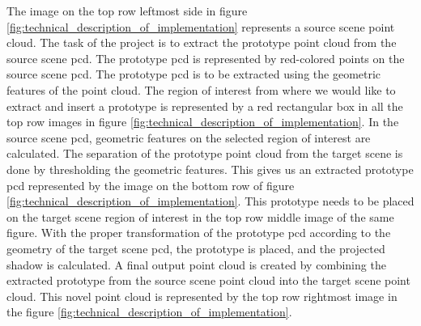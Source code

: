The image on the top row leftmost side in figure \ref{fig:technical_description_of_implementation} represents a source scene point cloud. The task of the project is to extract the prototype point cloud from the source scene \acrshort{pcd}. The prototype \acrshort{pcd} is represented by red-colored points on the source scene \acrshort{pcd}. The prototype \acrshort{pcd} is to be extracted using the geometric features of the point cloud. The region of interest from where we would like to extract and insert a prototype is represented by a red rectangular box in all the top row images in figure \ref{fig:technical_description_of_implementation}. In the source scene \acrshort{pcd}, geometric features on the selected region of interest are calculated. The separation of the prototype point cloud from the target scene is done by thresholding the geometric features. This gives us an extracted prototype \acrshort{pcd} represented by the image on the bottom row of figure \ref{fig:technical_description_of_implementation}. This prototype needs to be placed on the target scene region of interest in the top row middle image of the same figure. With the proper transformation of the prototype \acrshort{pcd} according to the geometry of the target scene \acrshort{pcd}, the prototype is placed, and the projected shadow is calculated. A final output point cloud is created by combining the extracted prototype from the source scene point cloud into the target scene point cloud. This novel point cloud is represented by the top row rightmost image in the figure \ref{fig:technical_description_of_implementation}.
